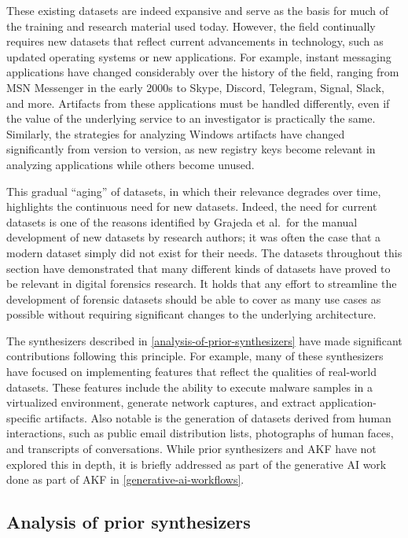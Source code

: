 These existing datasets are indeed expansive and serve as the basis for
much of the training and research material used today. However, the
field continually requires new datasets that reflect current
advancements in technology, such as updated operating systems or new
applications. For example, instant messaging applications have changed
considerably over the history of the field, ranging from MSN Messenger
in the early 2000s to Skype, Discord, Telegram, Signal, Slack, and more.
Artifacts from these applications must be handled differently, even if
the value of the underlying service to an investigator is practically
the same. Similarly, the strategies for analyzing Windows artifacts have
changed significantly from version to version, as new registry keys
become relevant in analyzing applications while others become unused.

This gradual ``aging'' of datasets, in which their relevance degrades
over time, highlights the continuous need for new datasets. Indeed, the
need for current datasets is one of the reasons identified by Grajeda et
al.~for the manual development of new datasets by research authors; it
was often the case that a modern dataset simply did not exist for their
needs. The datasets throughout this section have demonstrated that many
different kinds of datasets have proved to be relevant in digital
forensics research. It holds that any effort to streamline the
development of forensic datasets should be able to cover as many use
cases as possible without requiring significant changes to the
underlying architecture.

The synthesizers described in \autoref{analysis-of-prior-synthesizers}
have made significant contributions following this principle. For
example, many of these synthesizers have focused on implementing
features that reflect the qualities of real-world datasets. These
features include the ability to execute malware samples in a virtualized
environment, generate network captures, and extract application-specific
artifacts. Also notable is the generation of datasets derived from human
interactions, such as public email distribution lists, photographs of
human faces, and transcripts of conversations. While prior synthesizers
and AKF have not explored this in depth, it is briefly addressed as part
of the generative AI work done as part of AKF in \autoref{generative-ai-workflows}.

\subsection{Analysis of prior
synthesizers}\label{analysis-of-prior-synthesizers}

